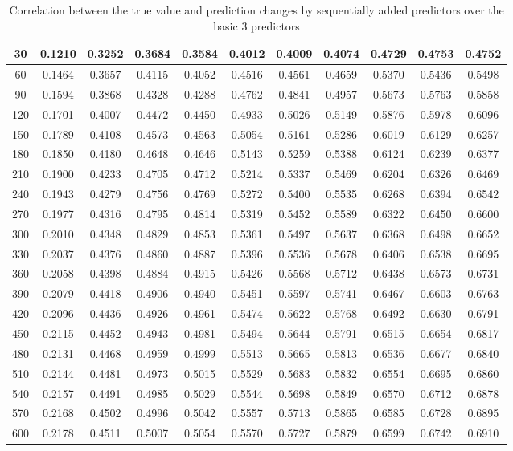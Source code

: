 \begin{table}[h!]
{\begin{tabular}{||c c c c c c c c c c c||}
30 & 0.1210 & 0.3252 & 0.3684 & 0.3584 & 0.4012 & 0.4009 & 0.4074 & 0.4729 & 0.4753 & 0.4752 \\ \hline
        60 & 0.1464 & 0.3657 & 0.4115 & 0.4052 & 0.4516 & 0.4561 & 0.4659 & 0.5370 & 0.5436 & 0.5498 \\ \hline
        90 & 0.1594 & 0.3868 & 0.4328 & 0.4288 & 0.4762 & 0.4841 & 0.4957 & 0.5673 & 0.5763 & 0.5858 \\ \hline
        120 & 0.1701 & 0.4007 & 0.4472 & 0.4450 & 0.4933 & 0.5026 & 0.5149 & 0.5876 & 0.5978 & 0.6096 \\ \hline
        150 & 0.1789 & 0.4108 & 0.4573 & 0.4563 & 0.5054 & 0.5161 & 0.5286 & 0.6019 & 0.6129 & 0.6257 \\ \hline
        180 & 0.1850 & 0.4180 & 0.4648 & 0.4646 & 0.5143 & 0.5259 & 0.5388 & 0.6124 & 0.6239 & 0.6377 \\ \hline
        210 & 0.1900 & 0.4233 & 0.4705 & 0.4712 & 0.5214 & 0.5337 & 0.5469 & 0.6204 & 0.6326 & 0.6469 \\ \hline
        240 & 0.1943 & 0.4279 & 0.4756 & 0.4769 & 0.5272 & 0.5400 & 0.5535 & 0.6268 & 0.6394 & 0.6542 \\ \hline
        270 & 0.1977 & 0.4316 & 0.4795 & 0.4814 & 0.5319 & 0.5452 & 0.5589 & 0.6322 & 0.6450 & 0.6600 \\ \hline
        300 & 0.2010 & 0.4348 & 0.4829 & 0.4853 & 0.5361 & 0.5497 & 0.5637 & 0.6368 & 0.6498 & 0.6652 \\ \hline
        330 & 0.2037 & 0.4376 & 0.4860 & 0.4887 & 0.5396 & 0.5536 & 0.5678 & 0.6406 & 0.6538 & 0.6695 \\ \hline
        360 & 0.2058 & 0.4398 & 0.4884 & 0.4915 & 0.5426 & 0.5568 & 0.5712 & 0.6438 & 0.6573 & 0.6731 \\ \hline
        390 & 0.2079 & 0.4418 & 0.4906 & 0.4940 & 0.5451 & 0.5597 & 0.5741 & 0.6467 & 0.6603 & 0.6763 \\ \hline
        420 & 0.2096 & 0.4436 & 0.4926 & 0.4961 & 0.5474 & 0.5622 & 0.5768 & 0.6492 & 0.6630 & 0.6791 \\ \hline
        450 & 0.2115 & 0.4452 & 0.4943 & 0.4981 & 0.5494 & 0.5644 & 0.5791 & 0.6515 & 0.6654 & 0.6817 \\ \hline
        480 & 0.2131 & 0.4468 & 0.4959 & 0.4999 & 0.5513 & 0.5665 & 0.5813 & 0.6536 & 0.6677 & 0.6840 \\ \hline
        510 & 0.2144 & 0.4481 & 0.4973 & 0.5015 & 0.5529 & 0.5683 & 0.5832 & 0.6554 & 0.6695 & 0.6860 \\ \hline
        540 & 0.2157 & 0.4491 & 0.4985 & 0.5029 & 0.5544 & 0.5698 & 0.5849 & 0.6570 & 0.6712 & 0.6878 \\ \hline
        570 & 0.2168 & 0.4502 & 0.4996 & 0.5042 & 0.5557 & 0.5713 & 0.5865 & 0.6585 & 0.6728 & 0.6895 \\ \hline
        600 & 0.2178 & 0.4511 & 0.5007 & 0.5054 & 0.5570 & 0.5727 & 0.5879 & 0.6599 & 0.6742 & 0.6910 \\ \hline \hline
\end{tabular}}
\caption{Correlation between the true value and prediction changes by sequentially added predictors over the basic 3 predictors}
\label{table:Corr}
\end{table}


